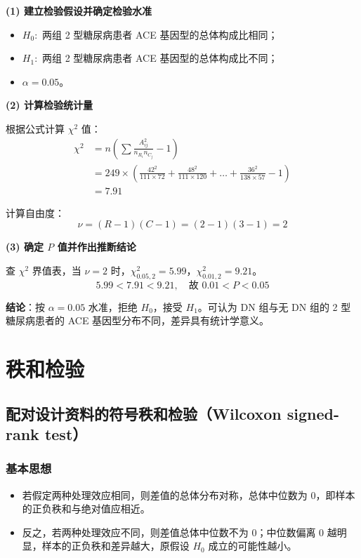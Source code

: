 \documentclass[lang=cn,10pt]{elegantbook}
\begin{document}
\begin{solution}
\textbf{(1) 建立检验假设并确定检验水准}
\begin{itemize}
    \item $H_0:$ 两组 2 型糖尿病患者 ACE 基因型的总体构成比相同；
    \item $H_1:$ 两组 2 型糖尿病患者 ACE 基因型的总体构成比不同；
    \item $\alpha = 0.05$。
\end{itemize}

\textbf{(2) 计算检验统计量}

根据公式计算 $\chi^2$ 值：
\begin{align*}
\chi^2 &= n \left( \sum \frac{A_{ij}^2}{n_{R_i} n_{C_j}} - 1 \right) \\
&= 249 \times \left( \frac{42^2}{111 \times 72} + \frac{48^2}{111 \times 120} + \dots + \frac{36^2}{138 \times 57} - 1 \right) \\
&= 7.91
\end{align*}

计算自由度：
\[
\nu = (R-1)(C-1) = (2-1)(3-1) = 2
\]

\textbf{(3) 确定 $P$ 值并作出推断结论}

查 $\chi^2$ 界值表，当 $\nu=2$ 时，$\chi^2_{0.05, 2} = 5.99$，$\chi^2_{0.01, 2} = 9.21$。
\[
5.99 < 7.91 < 9.21, \quad \text{故 } 0.01 < P < 0.05
\]

\textbf{结论}：按 $\alpha=0.05$ 水准，拒绝 $H_0$，接受 $H_1$。可认为 DN 组与无 DN 组的 2 型糖尿病患者的 ACE 基因型分布不同，差异具有统计学意义。
\end{solution}

\chapter{秩和检验}
\section{配对设计资料的符号秩和检验（Wilcoxon signed-rank test）}

\subsection{基本思想}
\begin{itemize}
    \item 若假定两种处理效应相同，则差值的总体分布对称，总体中位数为 0，即样本的正负秩和与绝对值应相近。
    \item 反之，若两种处理效应不同，则差值总体中位数不为 0；中位数偏离 0 越明显，样本的正负秩和差异越大，原假设 $H_0$ 成立的可能性越小。
\end{itemize}
\end{document}
